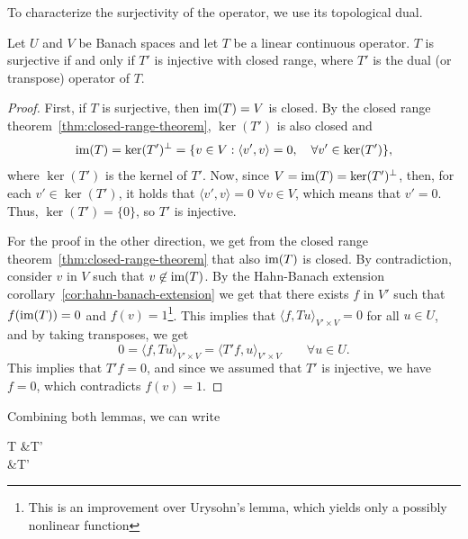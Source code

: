 To characterize the surjectivity of the operator, we use its topological dual.
\begin{lemma}
    Let $U$ and $V$ be Banach spaces and let $T$ be a linear continuous operator. $T$ is surjective if and only if $T'$ is injective with closed range, where $T'$ is the dual (or transpose) operator of $T$.
    \begin{proof}
        First, if $T$ is surjective, then $\operatorname{\text{im}} (T) = V$ is closed. By the closed range theorem~\ref{thm:closed-range-theorem}, $\ker(T')$ is also closed and 
        \begin{equation}
            \operatorname{\text{im}} (T) = \ker (T')^\bot = 
            \{v\in V: \langle v', v\rangle = 0,\quad \forall v' \in \ker(T')\},
        \end{equation}
        where $\ker(T')$ is the kernel of $T'$. Now, since $V = \operatorname{\text{im}}(T) = \ker(T')^\bot$, then, for each $v' \in \ker(T')$, it holds that $ \langle v', v\rangle = 0$ $\forall v \in V$, which means that $v' = 0$. Thus, $\ker(T') = \{0\}$, so $T'$ is injective.

        For the proof in the other direction, we get from the closed range theorem~\ref{thm:closed-range-theorem} that also $\operatorname{\text{im}}(T)$ is closed. By contradiction, consider $v$ in $V$ such that $v\not\in \operatorname{\text{im}}(T)$. By the Hahn-Banach extension corollary~\ref{cor:hahn-banach-extension} we get that there exists $f$ in $V'$ such that $f(\operatorname{\text{im}}(T)) = 0$ and $f(v)=1$\footnote{This is an improvement over Urysohn's lemma, which yields only a possibly nonlinear function}. This implies that $\langle f, Tu\rangle_{V'\times V} = 0$ for all $u\in U$, and by taking transposes, we get 
        \begin{equation*}
            0 = \langle f, Tu\rangle_{V'\times V} = \langle T'f, u\rangle_{V'\times V} \qquad \forall u\in U.
        \end{equation*}
        This implies that $T'f=0$, and since we assumed that $T'$ is injective, we have $f=0$, which contradicts $f(v)=1$. 
    \end{proof}
\end{lemma}
Combining both lemmas, we can write
\begin{tightalign*}
    T 
    &\Longleftrightarrow T'
    \\&\Longleftrightarrow T'
\end{tightalign*}

